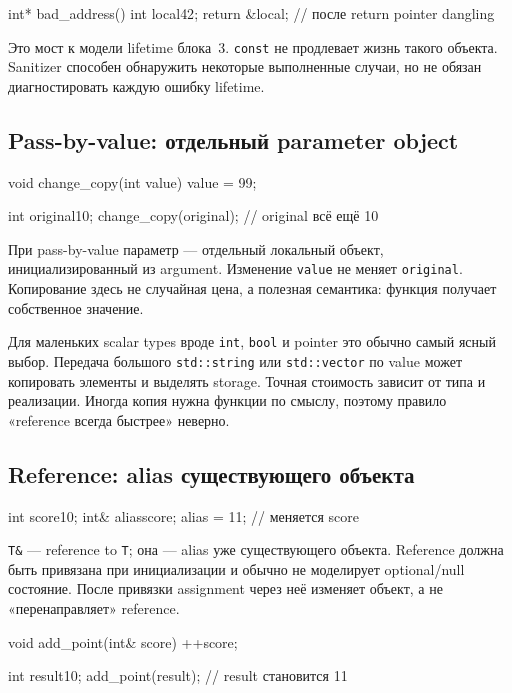\begin{cppcode}
int* bad_address() {
    int local{42};
    return &local; // после return pointer dangling
}
\end{cppcode}

Это мост к модели lifetime блока~3. \texttt{const} не продлевает жизнь такого
объекта. Sanitizer способен обнаружить некоторые выполненные случаи, но не
обязан диагностировать каждую ошибку lifetime.

\subsection{Pass-by-value: отдельный parameter object}

\begin{cppcode}
void change_copy(int value) {
    value = 99;
}

int original{10};
change_copy(original);
// original всё ещё 10
\end{cppcode}

При pass-by-value параметр --- отдельный локальный объект, инициализированный
из argument. Изменение \texttt{value} не меняет \texttt{original}. Копирование
здесь не случайная цена, а полезная семантика: функция получает собственное
значение.

Для маленьких scalar types вроде \texttt{int}, \texttt{bool} и pointer это
обычно самый ясный выбор. Передача большого \texttt{std::string} или
\texttt{std::vector} по value может копировать элементы и выделять storage.
Точная стоимость зависит от типа и реализации. Иногда копия нужна функции по
смыслу, поэтому правило «reference всегда быстрее» неверно.

\subsection{Reference: alias существующего объекта}

\begin{cppcode}
int score{10};
int& alias{score};
alias = 11; // меняется score
\end{cppcode}

\texttt{T\&} --- reference to \texttt{T}; она --- alias уже
существующего объекта. Reference должна быть привязана при инициализации и
обычно не моделирует optional/null состояние. После привязки assignment через
неё изменяет объект, а не «перенаправляет» reference.

\begin{cppcode}
void add_point(int& score) {
    ++score;
}

int result{10};
add_point(result); // result становится 11
\end{cppcode}

